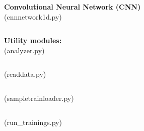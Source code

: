 \documentclass[a4paper,times,12pt]{article}
\begin{document}
\noindent \textbf{Convolutional Neural Network (CNN)}\\
(cnnnetwork1d.py) 
\inputminted[breaklines]{python}{../Src/cnnnetwork1d.py}

\noindent \textbf{Utility modules:}\\
(analyzer.py)
\inputminted[breaklines]{python}{../Src/analyzer.py}

\noindent (readdata.py)
\inputminted[breaklines]{python}{../Src/readdata.py}

\noindent (sampletrainloader.py)
\inputminted[breaklines]{python}{../Src/sampletrainloader.py}

\noindent (run\_trainings.py)
\inputminted[breaklines]{python}{../Src/run_trainings.py}

\newpage
\end{document}
